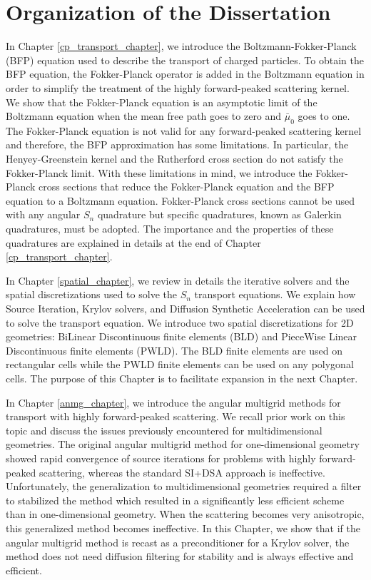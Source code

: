 \section{Organization of the Dissertation}
\noindent In Chapter \ref{cp_transport_chapter}, we introduce the 
Boltzmann-Fokker-Planck (BFP) equation used to describe the transport of
charged particles. To obtain the BFP equation, the Fokker-Planck operator is
added in the Boltzmann equation in order to simplify the treatment of the
highly forward-peaked scattering kernel. We show that the Fokker-Planck
equation is an asymptotic limit of the Boltzmann equation when the mean free
path goes to zero and $\bar{\mu}_0$ goes to one. The Fokker-Planck equation is
not valid for any forward-peaked scattering kernel and therefore, the BFP
approximation has some limitations. In particular, the Henyey-Greenstein
kernel and the Rutherford cross section do not satisfy the Fokker-Planck
limit. With these limitations in mind, we introduce the Fokker-Planck cross
sections that reduce the Fokker-Planck equation and the BFP equation
to a Boltzmann equation. Fokker-Planck cross sections cannot be used with any
angular $S_n$ quadrature but specific quadratures, known as Galerkin
quadratures, must be adopted. The importance and the properties of these
quadratures are explained in details at the end of Chapter
\ref{cp_transport_chapter}.

In Chapter \ref{spatial_chapter}, we review in details the iterative
solvers and the spatial discretizations used to solve the $S_n$ transport 
equations. We explain how Source Iteration, Krylov solvers, and Diffusion 
Synthetic Acceleration can be used to solve the transport equation.
We introduce two spatial discretizations for 2D geometries: BiLinear 
Discontinuous finite elements (BLD) and PieceWise 
Linear Discontinuous finite elements (PWLD). The BLD finite elements are used 
on rectangular cells while the PWLD finite elements can be used on any polygonal 
cells. The purpose of this Chapter is to facilitate expansion in the next
Chapter.

In Chapter \ref{anmg_chapter}, we introduce the angular multigrid 
methods for transport with highly forward-peaked scattering. We recall  
prior work on this topic and discuss the issues previously encountered for 
multidimensional geometries. The original angular multigrid method for 
one-dimensional geometry showed rapid convergence of source iterations for 
problems with highly forward-peaked scattering, whereas the standard SI+DSA
approach is ineffective. Unfortunately, the 
generalization to multidimensional geometries required a filter to stabilized 
the method which resulted in a significantly less efficient scheme than in 
one-dimensional geometry. When 
the scattering becomes very anisotropic, this generalized method becomes
ineffective. In this Chapter, we show that if the angular multigrid method is 
recast as a preconditioner for a Krylov solver, the method does not need 
diffusion filtering for stability and is always effective and efficient.

